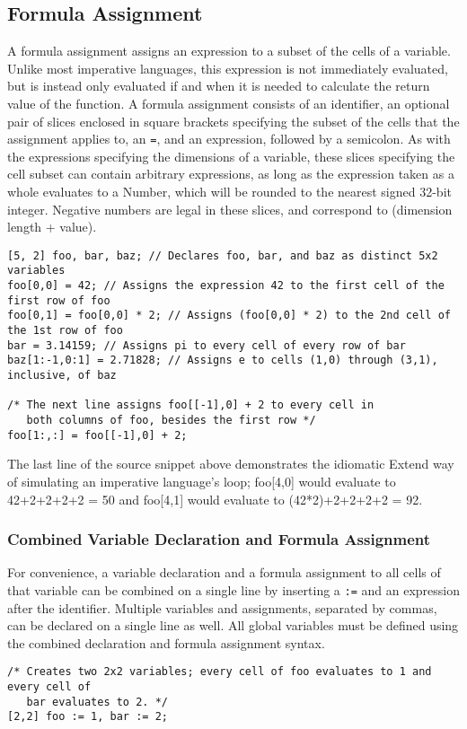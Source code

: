 \subsection{Formula Assignment}
\label{sec:formula}
A formula assignment assigns an expression to a subset of the cells of a variable. Unlike most imperative languages, this expression is not immediately evaluated, but is instead only evaluated if and when it is needed to calculate the return value of the function. A formula assignment consists of an identifier, an optional pair of slices enclosed in square brackets specifying the subset of the cells that the assignment applies to, an \texttt{=}, and an expression, followed by a semicolon. As with the expressions specifying the dimensions of a variable, these slices specifying the cell subset can contain arbitrary expressions, as long as the expression taken as a whole evaluates to a Number, which will be rounded to the nearest signed 32-bit integer. Negative numbers are legal in these slices, and correspond to (dimension length + value).
\begin{lstlisting}
[5, 2] foo, bar, baz; // Declares foo, bar, and baz as distinct 5x2 variables
foo[0,0] = 42; // Assigns the expression 42 to the first cell of the first row of foo
foo[0,1] = foo[0,0] * 2; // Assigns (foo[0,0] * 2) to the 2nd cell of the 1st row of foo
bar = 3.14159; // Assigns pi to every cell of every row of bar
baz[1:-1,0:1] = 2.71828; // Assigns e to cells (1,0) through (3,1), inclusive, of baz

/* The next line assigns foo[[-1],0] + 2 to every cell in
   both columns of foo, besides the first row */
foo[1:,:] = foo[[-1],0] + 2;
\end{lstlisting}
The last line of the source snippet above demonstrates the idiomatic Extend way of simulating an imperative language's loop; foo[4,0] would evaluate to 42+2+2+2+2 = 50 and foo[4,1] would evaluate to (42*2)+2+2+2+2 = 92.
\subsubsection{Combined Variable Declaration and Formula Assignment}
\label{sec:CombinedDeclAsgn}
For convenience, a variable declaration and a formula assignment to all cells of that variable can be combined on a single line by inserting a \texttt{:=} and an expression after the identifier. Multiple variables and assignments, separated by commas, can be declared on a single line as well. All global variables must be defined using the combined declaration and formula assignment syntax.
\begin{lstlisting}
/* Creates two 2x2 variables; every cell of foo evaluates to 1 and every cell of
   bar evaluates to 2. */
[2,2] foo := 1, bar := 2;
\end{lstlisting}
